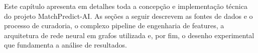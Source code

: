 
Este capítulo apresenta em detalhes toda a concepção e implementação técnica do projeto MatchPredict-AI. As seções a seguir descrevem as fontes de dados e o processo de curadoria, o complexo pipeline de engenharia de features, a arquitetura de rede neural em grafos utilizada e, por fim, o desenho experimental que fundamenta a análise de resultados.





